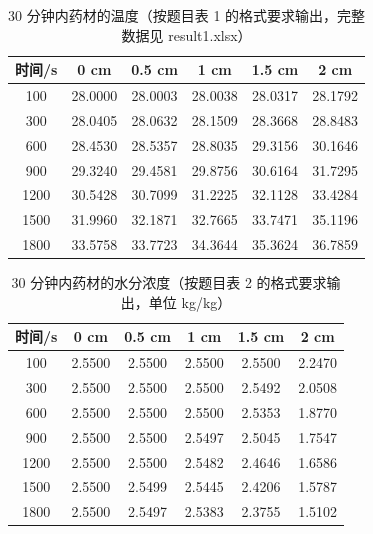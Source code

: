 \begin{table}[H]
\centering
\caption{30 分钟内药材的温度（按题目表 1 的格式要求输出，完整数据见 result1.xlsx）}
\label{tab:q1t}
\begin{tabular}{c|ccccc}
\toprule
时间/s & 0 cm & 0.5 cm & 1 cm & 1.5 cm & 2 cm \\
\midrule
100 & 28.0000 & 28.0003 & 28.0038 & 28.0317 & 28.1792 \\
300 & 28.0405 & 28.0632 & 28.1509 & 28.3668 & 28.8483 \\
600 & 28.4530 & 28.5357 & 28.8035 & 29.3156 & 30.1646 \\
900 & 29.3240 & 29.4581 & 29.8756 & 30.6164 & 31.7295 \\
1200 & 30.5428 & 30.7099 & 31.2225 & 32.1128 & 33.4284 \\
1500 & 31.9960 & 32.1871 & 32.7665 & 33.7471 & 35.1196 \\
1800 & 33.5758 & 33.7723 & 34.3644 & 35.3624 & 36.7859 \\
\bottomrule
\end{tabular}
\end{table}

\begin{table}[H]
\centering
\caption{30 分钟内药材的水分浓度（按题目表 2 的格式要求输出，单位 kg/kg）}
\label{tab:q1c}
\begin{tabular}{c|ccccc}
\toprule
时间/s & 0 cm & 0.5 cm & 1 cm & 1.5 cm & 2 cm \\
\midrule
100 & 2.5500 & 2.5500 & 2.5500 & 2.5500 & 2.2470 \\
300 & 2.5500 & 2.5500 & 2.5500 & 2.5492 & 2.0508 \\
600 & 2.5500 & 2.5500 & 2.5500 & 2.5353 & 1.8770 \\
900 & 2.5500 & 2.5500 & 2.5497 & 2.5045 & 1.7547 \\
1200 & 2.5500 & 2.5500 & 2.5482 & 2.4646 & 1.6586 \\
1500 & 2.5500 & 2.5499 & 2.5445 & 2.4206 & 1.5787 \\
1800 & 2.5500 & 2.5497 & 2.5383 & 2.3755 & 1.5102 \\
\bottomrule
\end{tabular}
\end{table}
